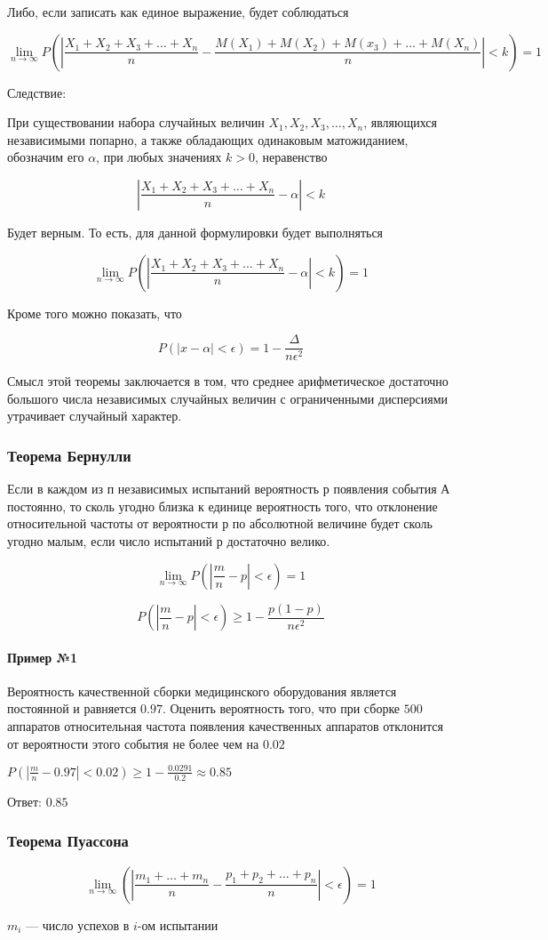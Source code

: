 \documentclass{article}
\begin{document}
Либо, если записать как единое выражение, будет соблюдаться

$$
\lim\limits_{n \to \infty} P(
|\frac{X_1 + X_2 + X_3 + \dots + X_n}{n} - \frac{M(X_1) + M(X_2) + M(x_3) + \dots + M(X_n)}{n}| < k) = 1
$$

Следствие:

При существовании набора случайных величин $X_1, X_2, X_3, \dots, X_n$, являющихся независимыми попарно, а также обладающих одинаковым матожиданием, обозначим его $\alpha$, при любых значениях $k > 0$, неравенство

$$
|\frac{X_1 + X_2 + X_3 + \dots + X_n}{n} - \alpha| < k
$$

Будет верным. То есть, для данной формулировки будет выполняться

$$
\lim\limits_{n \to \infty} P(|\frac{X_1 + X_2 + X_3 + \dots + X_n}{n} - \alpha| < k) = 1
$$

Кроме того можно показать, что

$$
P(|x - \alpha| < \epsilon) = 1 - \frac{\Delta}{n \epsilon^2}
$$

Смысл этой теоремы заключается в том, что среднее арифметическое достаточно большого числа независимых случайных величин с ограниченными дисперсиями утрачивает случайный характер.

\subsubsection{Теорема Бернулли}

Если в каждом из п независимых испытаний вероятность $р$ появления события $А$ постоянно, то сколь угодно близка к единице вероятность того, что отклонение относительной частоты от вероятности $р$ по абсолютной величине будет сколь угодно малым, если число испытаний $р$ достаточно велико.

$$\lim\limits_{n \to \infty} P(|\frac{m}{n} - p| < \epsilon) = 1$$

$$P(|\frac{m}{n} - p| < \epsilon) \ge 1 - \frac{p (1 - p)}{n \epsilon^2}$$

\paragraph{Пример №1}

Вероятность качественной сборки медицинского оборудования является постоянной и равняется $0.97$. Оценить вероятность того, что при сборке $500$ аппаратов относительная частота появления качественных аппаратов отклонится от вероятности этого события не более чем на $0.02$

$P(|\frac{m}{n} - 0.97| < 0.02) \ge 1 - \frac{0.0291}{0.2} \approx 0.85$

Ответ: $0.85$

\subsubsection{Теорема Пуассона}

$$\lim\limits_{n \to \infty} (|\frac{m_1 + \dots + m_n}{n} - \frac{p_1 + p_2 + \dots + p_n}{n}| < \epsilon) = 1$$

$m_{i}$ — число успехов в $i$-ом испытании
\end{document}
